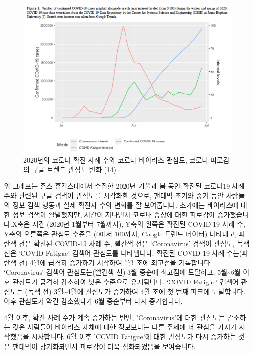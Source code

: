 \documentclass[
  letterpaper,
]{book}
\begin{document}
\begin{figure}[H]

{\centering \includegraphics{img/fig10.png}

}

\caption{2020년의 코로나 확진 사례 수와 코로나 바이러스 관심도, 코로나
피로감의 구글 트렌드 관심도 변화 (14)}

\end{figure}%

위 그래프는 존스 홉킨스대에서 수집한 2020년 겨울과 봄 동안 확진된
코로나19 사례 수와 관련된 구글 검색어 관심도를 시각화한 것으로, 팬데믹
초기와 중기 동안 사람들의 정보 검색 행동과 실제 확진자 수의 변화를 잘
보여줍니다. 초기에는 바이러스에 대한 정보 검색이 활발했지만, 시간이
지나면서 코로나 증상에 대한 피로감이 증가했습니다.X축은 시간 (2020년
1월부터 7월까지), Y축의 왼쪽은 확진된 COVID-19 사례 수, Y축의 오른쪽은
관심도 수준을 (0에서 100까지, Google 트렌드 데이터) 나타내고, 파란색
선은 확진된 COVID-19 사례 수, 빨간색 선은 `Coronavirus' 검색어 관심도,
녹색 선은 `COVID Fatigue' 검색어 관심도를 나타냅니다. 확진된 COVID-19
사례 수는(파란색 선) 4월에 급격히 증가하기 시작하여 7월 초에 최고점을
기록합니다. `Coronavirus' 검색어 관심도는(빨간색 선) 3월 중순에 최고점에
도달하고, 5월\textasciitilde6월 이후 관심도가 급격히 감소하여 낮은
수준으로 유지됩니다. `COVID Fatigue' 검색어 관심도는 (녹색 선)
3월\textasciitilde4월에 관심도가 증가하여 4월 초에 첫 번째 피크에
도달합니다. 이후 관심도가 약간 감소했다가 6월 중순부터 다시 증가합니다.

4월 이후, 확진 사례 수가 계속 증가하는 반면, 'Coronavirus'에 대한
관심도는 감소하는 것은 사람들이 바이러스 자체에 대한 정보보다는 다른
주제에 더 관심을 가지기 시작했음을 시사합니다. 6월 이후 'COVID
Fatigue'에 대한 관심도가 다시 증가하는 것은 팬데믹이 장기화되면서
피로감이 더욱 심화되었음을 보여줍니다.
\end{document}
